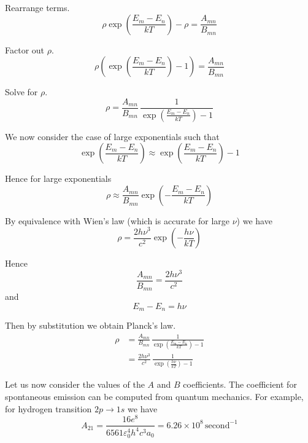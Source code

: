 \documentclass[12pt]{article}
\newcommand\BMN{B_{mn}} %
\newcommand\AMN{A_{mn}} %
\newcommand\RHO{\rho}
\newcommand\ABSORPTION{\substack{\\[1ex] \text{absorption}}}
\newcommand\INDUCED{\substack{\\[1ex] \text{induced}\\ \text{emission}}}
\newcommand\SPONTANEOUS{\substack{\\[1ex] \text{spontaneous}\\ \text{emission}}}
\begin{document}
Rearrange terms.
\begin{equation*}
\RHO\exp\left(\frac{E_m-E_n}{kT}\right)
-\RHO=\frac{\AMN}{\BMN}
\end{equation*}

Factor out $\RHO$.
\begin{equation*}
\RHO\left(\exp\left(\frac{E_m-E_n}{kT}\right)-1\right)
=\frac{\AMN}{\BMN}
\end{equation*}

Solve for $\RHO$.
\begin{equation*}
\RHO
=\frac{\AMN}{\BMN}\,\frac{1}{\exp\left(\frac{E_m-E_n}{kT}\right)-1}
\end{equation*}

We now consider the case of large exponentials such that
\begin{equation*}
\exp\left(\frac{E_m-E_n}{kT}\right)\approx\exp\left(\frac{E_m-E_n}{kT}\right)-1
\end{equation*}

Hence for large exponentials
\begin{equation*}
\RHO\approx
\frac{\AMN}{\BMN}\exp\left(-\frac{E_m-E_n}{kT}\right)
\end{equation*}

By equivalence with Wien's law (which is accurate for large $\nu$) we have
\begin{equation*}
\RHO=\frac{2h\nu^3}{c^2}\exp\left(-\frac{h\nu}{kT}\right)
\end{equation*}

Hence
\begin{equation*}
\frac{\AMN}{\BMN}=\frac{2h\nu^3}{c^2}
\tag{4}
\end{equation*}
and
\begin{equation*}
E_m-E_n=h\nu
\end{equation*}

Then by substitution we obtain Planck's law.
\begin{align*}
\RHO
&=\frac{\AMN}{\BMN}\,\frac{1}{\exp\left(\frac{E_m-E_n}{kT}\right)-1}
\\[1.5ex]
&=\frac{2h\nu^3}{c^2}\,\frac{1}{\exp\left(\frac{h\nu}{kT}\right)-1}
\end{align*}


Let us now consider the values of the $A$ and $B$ coefficients.
The coefficient for spontaneous emission can be computed from quantum mechanics.
For example, for hydrogen transition $2p\rightarrow1s$ we have
\begin{equation*}
A_{21}=\frac{16e^8}{6561\varepsilon_0^4h^4c^3a_0}
=6.26\times10^8\,\text{second}^{-1}
\end{equation*}
\end{document}
